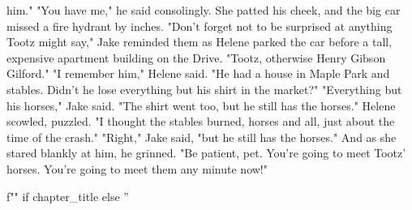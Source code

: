 \documentclass{novel}
\begin{document}
him." "You have me," he said consolingly. She patted his cheek, and the big car missed a fire hydrant by inches. "Don’t forget not to be surprised at anything Tootz might say," Jake reminded them as Helene parked the car before a tall, expensive apartment building on the Drive. "Tootz, otherwise Henry Gibson Gilford." "I remember him," Helene said. "He had a house in Maple Park and stables. Didn’t he lose everything but his shirt in the market?" "Everything but his horses," Jake said. "The shirt went too, but he still has the horses." Helene scowled, puzzled. "I thought the stables burned, horses and all, just about the time of the crash." "Right," Jake said, "but he still has the horses." And as she stared blankly at him, he grinned. "Be patient, pet. You’re going to meet Tootz’ horses. You’re going to meet them any minute now!"

\begin{ChapterStart}
\vspace{3\nbs}
f"" if chapter_title else ''
\end{ChapterStart}
\end{document}
